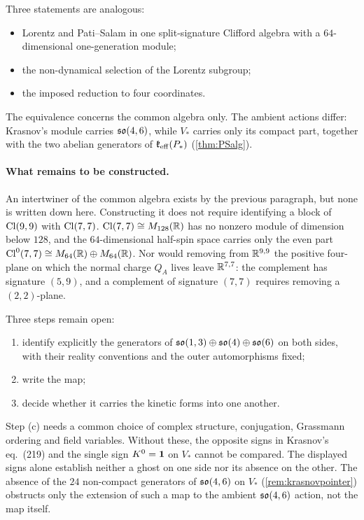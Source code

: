 Three statements are analogous:
\begin{itemize}
\item Lorentz and Pati--Salam in one split-signature Clifford algebra with a $64$-dimensional one-generation module;
\item the non-dynamical selection of the Lorentz subgroup;
\item the imposed reduction to four coordinates.
\end{itemize}
The equivalence concerns the common algebra only. The ambient actions differ: Krasnov's module carries $\mathfrak{so}(4,6)$, while $V_*$ carries only
its compact part, together with the two abelian generators of $\mathfrak k_{\rm eff}(P_*)$ (\cref{thm:PSalg}).

\paragraph{What remains to be constructed.} An intertwiner of the common algebra exists by the previous paragraph, but none is written down
here. Constructing it does not require identifying a block of $\mathrm{Cl}(9,9)$ with $\mathrm{Cl}(7,7)$. $\mathrm{Cl}(7,7)\cong M_{128}(\mathbb{R})$ has no nonzero module of
dimension below $128$, and the $64$-dimensional half-spin space carries only the even part $\mathrm{Cl}^0(7,7)\cong M_{64}(\mathbb{R})\oplus M_{64}(\mathbb{R})$. Nor
would removing from $\mathbb{R}^{9,9}$ the positive four-plane on which the normal charge $Q_A$ lives leave $\mathbb{R}^{7,7}$: the complement has signature
$(5,9)$, and a complement of signature $(7,7)$ requires removing a $(2,2)$-plane.

Three steps remain open:
\begin{enumerate}[label=(\alph*),leftmargin=2.2em]
\item identify explicitly the generators of $\mathfrak{so}(1,3)\oplus\mathfrak{so}(4)\oplus\mathfrak{so}(6)$ on both sides, with their reality conventions and the outer
automorphisms fixed;
\item write the map;
\item decide whether it carries the kinetic forms into one another.
\end{enumerate}
Step (c) needs a common choice of complex structure, conjugation, Grassmann ordering and field variables. Without these, the opposite signs in
Krasnov's eq.~(219) and the single sign $K^0=\mathbf 1$ on $V_*$ cannot be compared. The displayed signs alone establish neither a ghost on one
side nor its absence on the other. The absence of the $24$ non-compact generators of $\mathfrak{so}(4,6)$ on $V_*$ (\cref{rem:krasnovpointer})
obstructs only the extension of such a map to the ambient $\mathfrak{so}(4,6)$ action, not the map itself.

